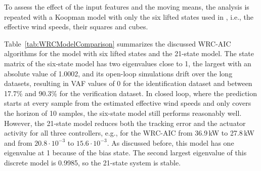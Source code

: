 To assess the effect of the input features and the moving means, the analysis is repeated with a Koopman model with only the six lifted states used in \cite{dittmer2023koopman}, i.e., the effective wind speeds, their squares and cubes.


Table~\ref{tab:WRCModelComparison} summarizes the discussed WRC-AIC algorithms for the model with six lifted states and the 21-state model. The state matrix of the six-state model has two eigenvalues close to 1, the largest with an absolute value of 1.0002, and its open-loop simulations drift over the long datasets, resulting in VAF values of 0 for the identification dataset and between 17.7\% and 90.3\% for the verification dataset. In closed loop, where the prediction starts at every sample from the estimated effective wind speeds and only covers the horizon of 10 samples, the six-state model still performs reasonably well. However, the 21-state model reduces both the tracking error and the actuator activity for all three controllers, e.g., for the WRC-AIC from 36.9\,kW to 27.8\,kW and from $20.8 \cdot 10^{-3}$ to $15.6 \cdot 10^{-3}$. As discussed before, this model has one eigenvalue at 1 because of the bias state. The second largest eigenvalue of this discrete model is 0.9985, so the 21-state system is stable.



